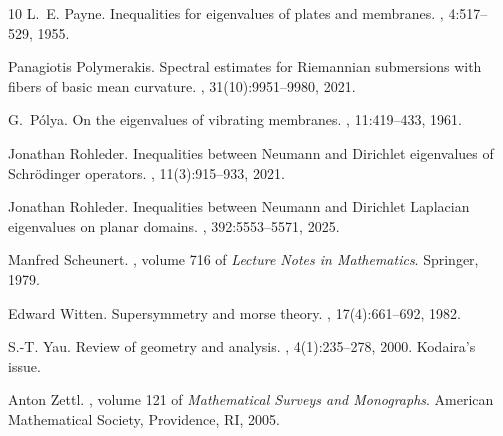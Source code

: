 \documentclass{amsart}
\theoremstyle{definition}
\theoremstyle{remark}
\numberwithin{equation}{section}
\begin{document}
\begin{thebibliography}{10}
L.~E. Payne.
\newblock Inequalities for eigenvalues of plates and membranes.
, 4:517--529, 1955.

Panagiotis Polymerakis.
\newblock Spectral estimates for Riemannian submersions with fibers of basic mean curvature.
, 31(10):9951--9980, 2021.

G.~Pólya.
\newblock On the eigenvalues of vibrating membranes.
, 11:419--433, 1961.

Jonathan Rohleder.
\newblock Inequalities between {N}eumann and {D}irichlet eigenvalues of {S}chr{\"o}dinger operators.
, 11(3):915--933, 2021.

Jonathan Rohleder.
\newblock Inequalities between {N}eumann and {D}irichlet {L}aplacian eigenvalues on planar domains.
, 392:5553--5571, 2025.

Manfred Scheunert.
, volume 716 of {\em Lecture Notes in Mathematics}.
\newblock Springer, 1979.

Edward Witten.
\newblock Supersymmetry and morse theory.
, 17(4):661--692, 1982.

S.-T. Yau.
\newblock Review of geometry and analysis.
, 4(1):235--278, 2000.
\newblock Kodaira's issue.

Anton Zettl.
, volume 121 of {\em Mathematical Surveys and Monographs}.
\newblock American Mathematical Society, Providence, RI, 2005.

\end{thebibliography}
\end{document}

